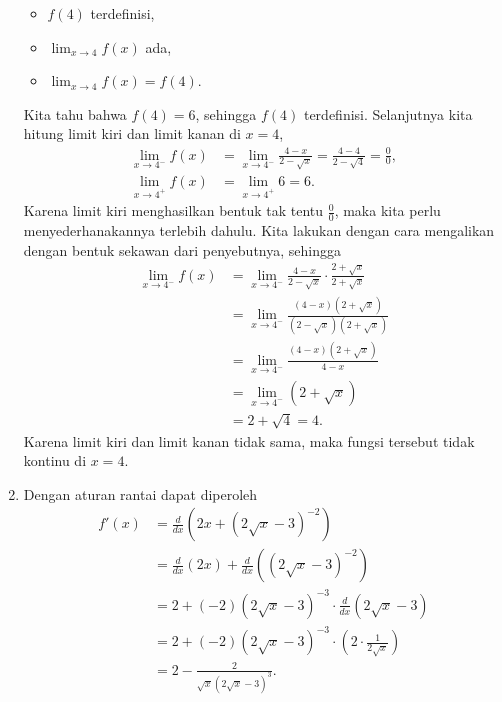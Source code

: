 \documentclass[11pt,openany,a4paper]{article}
\begin{document}
\begin{enumerate}
          \begin{itemize}
              \item $f(4)$ terdefinisi,
              \item $\lim_{x \to 4} f(x)$ ada,
              \item $\lim_{x \to 4} f(x) = f(4)$.
          \end{itemize}
          Kita tahu bahwa $f(4)=6$, sehingga $f(4)$ terdefinisi. Selanjutnya kita hitung limit kiri dan limit kanan di $x=4$,
          \begin{align*}
              \lim_{x \to 4^-} f(x) & = \lim_{x \to 4^-} \frac{4 - x}{2 - \sqrt{x}} = \frac{4 - 4}{2 - \sqrt{4}} = \frac{0}{0}, \\
              \lim_{x \to 4^+} f(x) & = \lim_{x \to 4^+} 6 = 6.
          \end{align*}
          Karena limit kiri menghasilkan bentuk tak tentu $\frac{0}{0}$, maka kita perlu menyederhanakannya terlebih dahulu. Kita lakukan dengan cara mengalikan dengan bentuk sekawan dari penyebutnya, sehingga
          \begin{align*}
              \lim_{x \to 4^-} f(x) & = \lim_{x \to 4^-} \frac{4 - x}{2 - \sqrt{x}} \cdot \frac{2 + \sqrt{x}}{2 + \sqrt{x}}      \\
                                    & = \lim_{x \to 4^-} \frac{(4 - x)(2 + \sqrt{x})}{(2 - \sqrt{x})(2 + \sqrt{x})}              \\
                                    & = \lim_{x \to 4^-} \frac{(4 - x)(2 + \sqrt{x})}{4 - x}                                     \\
                                    & = \lim_{x \to 4^-} (2 + \sqrt{x})                                                          \\
                                    & = 2 + \sqrt{4}                                                                        = 4.
          \end{align*}
          Karena limit kiri dan limit kanan tidak sama, maka fungsi tersebut tidak kontinu di $x=4$.
    \item Dengan aturan rantai dapat diperoleh
          \begin{align*}
              f'(x) & = \frac{d}{dx}\left(2x+(2\sqrt{x} - 3)^{-2}\right)                           \\
                    & =\frac{d}{dx}(2x)+\frac{d}{dx}((2\sqrt{x} - 3)^{-2})                         \\
                    & =2 + (-2)(2\sqrt{x} - 3)^{-3} \cdot \frac{d}{dx}(2\sqrt{x} - 3)              \\
                    & =2 + (-2)(2\sqrt{x} - 3)^{-3} \cdot \left(2 \cdot \frac{1}{2\sqrt{x}}\right) \\
                    & =2 - \frac{2}{\sqrt{x}(2\sqrt{x} - 3)^3}.
          \end{align*}
\end{enumerate}
\end{document}
